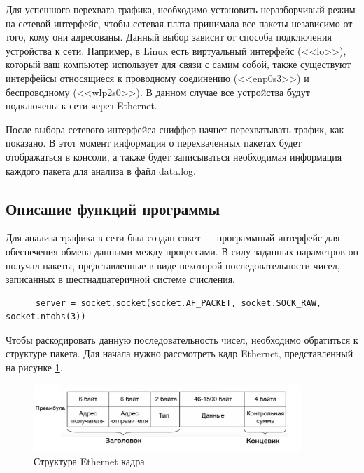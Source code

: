 \documentclass[bachelor, och, coursework]{SCWorks}
\begin{document}
  Для успешного перехвата трафика, необходимо установить неразборчивый режим на сетевой интерфейс, чтобы сетевая плата принимала
  все пакеты независимо от того, кому они адресованы. Данный выбор зависит от способа подключения устройства к сети. Например, в Linux
  есть виртуальный интерфейс (<<lo>>), который ваш компьютер использует для связи с самим собой, также существуют интерфейсы относящиеся
  к проводному соединению (<<enp0s3>>) и беспроводному (<<wlp2s0>>). В данном случае все устройства будут подключены к сети через Ethernet.
  
  После выбора сетевого интерфейса сниффер начнет перехватывать трафик, как показано. В этот момент информация о перехваченных пакетах будет отображаться
  в консоли, а также будет записываться необходимая информация каждого пакета для анализа в файл data.log.
  
  \subsection{Описание функций программы}

    Для анализа трафика в сети был создан сокет --- программный интерфейс для обеспечения обмена данными между процессами. В силу заданных параметров он
    получал пакеты, представленные в виде некоторой последовательности чисел, записанных в шестнадцатеричной системе счисления.
    
    \begin{verbatim}
      server = socket.socket(socket.AF_PACKET, socket.SOCK_RAW, socket.ntohs(3))
    \end{verbatim}
    
    Чтобы раскодировать данную последовательность чисел, необходимо обратиться к структуре пакета. Для начала нужно рассмотреть кадр Ethernet, представленный
    на рисунке \ref{eth-frame}.
    
    \begin{figure}[H]
      \centering
      \includegraphics[width=0.9\textwidth]{photo/eth-frame.jpg}
      \caption{Структура Ethernet кадра}
      \label{eth-frame}
    \end{figure}
    
\end{document}

